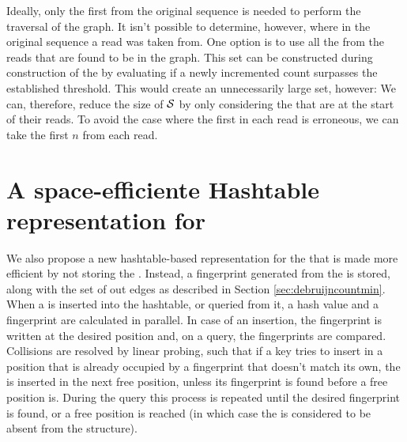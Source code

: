 Ideally, only the first \kmer from the original sequence is  needed to perform the traversal of the graph. It isn't possible to determine, however, where in the original sequence a read was taken from. One option is to use all the  from the reads that are found to be in the graph. This set can be constructed during construction of the \dBCM by evaluating if a newly incremented  count surpasses the established threshold. This would create an unnecessarily large set, however:  We can, therefore, reduce the size of $\strsetname{S}$ by only considering the  that are at the start of their reads. To avoid the case where the first \kmer in each read is erroneous, we can take the first $n$  from each read. 

\section{A space-efficiente Hashtable representation for }
\label{sec:debruijnhashtable}

We also propose a new hashtable-based representation for the \dBG that is made more efficient by not storing the \kmer. Instead,
a fingerprint generated from the \kmer is stored, along with the set of out edges as described in Section \ref{sec:debruijncountmin}.
When a \kmer is inserted into the hashtable, or queried from it, a hash value and a fingerprint are calculated in parallel.
In case of an insertion, the fingerprint is written at the desired position and, on a query, the fingerprints are compared. Collisions
are resolved by linear probing, such that if a key tries to insert in a position that is already occupied by a fingerprint that doesn't 
match its own, the \kmer is inserted in the next free position, unless its fingerprint is found before a free position is. During the
query this process is repeated until the desired fingerprint is found, or a free position is reached (in which case the \kmer is
considered to be absent from the structure).

